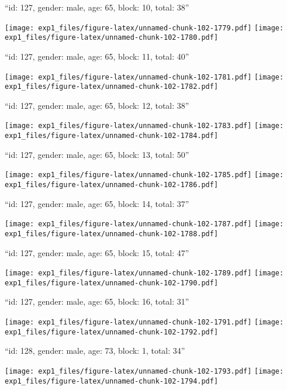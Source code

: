 \documentclass[11pt,,]{article}
\begin{document}
\newpage
[1] 

``id: 127, gender: male, age: 65, block: 10, total: 38''

\texttt{[image: exp1\_files/figure-latex/unnamed-chunk-102-1779.pdf]}
\texttt{[image: exp1\_files/figure-latex/unnamed-chunk-102-1780.pdf]}

\newpage
[1] 

``id: 127, gender: male, age: 65, block: 11, total: 40''

\texttt{[image: exp1\_files/figure-latex/unnamed-chunk-102-1781.pdf]}
\texttt{[image: exp1\_files/figure-latex/unnamed-chunk-102-1782.pdf]}

\newpage
[1] 

``id: 127, gender: male, age: 65, block: 12, total: 38''

\texttt{[image: exp1\_files/figure-latex/unnamed-chunk-102-1783.pdf]}
\texttt{[image: exp1\_files/figure-latex/unnamed-chunk-102-1784.pdf]}

\newpage
[1] 

``id: 127, gender: male, age: 65, block: 13, total: 50''

\texttt{[image: exp1\_files/figure-latex/unnamed-chunk-102-1785.pdf]}
\texttt{[image: exp1\_files/figure-latex/unnamed-chunk-102-1786.pdf]}

\newpage
[1] 

``id: 127, gender: male, age: 65, block: 14, total: 37''

\texttt{[image: exp1\_files/figure-latex/unnamed-chunk-102-1787.pdf]}
\texttt{[image: exp1\_files/figure-latex/unnamed-chunk-102-1788.pdf]}

\newpage
[1] 

``id: 127, gender: male, age: 65, block: 15, total: 47''

\texttt{[image: exp1\_files/figure-latex/unnamed-chunk-102-1789.pdf]}
\texttt{[image: exp1\_files/figure-latex/unnamed-chunk-102-1790.pdf]}

\newpage
[1] 

``id: 127, gender: male, age: 65, block: 16, total: 31''

\texttt{[image: exp1\_files/figure-latex/unnamed-chunk-102-1791.pdf]}
\texttt{[image: exp1\_files/figure-latex/unnamed-chunk-102-1792.pdf]}

\newpage
[1] 

``id: 128, gender: male, age: 73, block: 1, total: 34''

\texttt{[image: exp1\_files/figure-latex/unnamed-chunk-102-1793.pdf]}
\texttt{[image: exp1\_files/figure-latex/unnamed-chunk-102-1794.pdf]}
\end{document}
